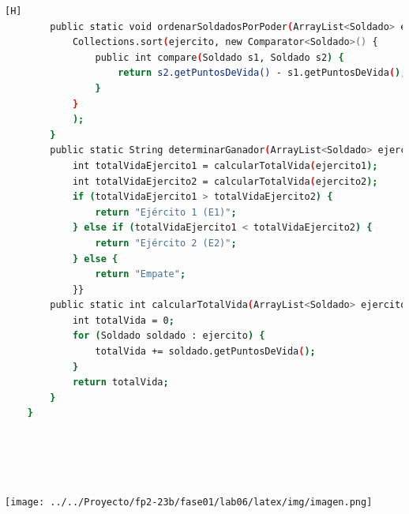 \documentclass{article}
\begin{document}
\begin{lstlisting}[language=bash,caption={Creando la clase principal de VideoJuego_v3.java}][H]
	    public static void ordenarSoldadosPorPoder(ArrayList<Soldado> ejercito) {
	        Collections.sort(ejercito, new Comparator<Soldado>() {     
	            public int compare(Soldado s1, Soldado s2) {
	                return s2.getPuntosDeVida() - s1.getPuntosDeVida();
	            }
	        }
	        );
	    }
	    public static String determinarGanador(ArrayList<Soldado> ejercito1, ArrayList<Soldado> ejercito2) {
	        int totalVidaEjercito1 = calcularTotalVida(ejercito1);
	        int totalVidaEjercito2 = calcularTotalVida(ejercito2);
	        if (totalVidaEjercito1 > totalVidaEjercito2) {
	            return "Ejército 1 (E1)";
	        } else if (totalVidaEjercito1 < totalVidaEjercito2) {
	            return "Ejército 2 (E2)";
	        } else {
	            return "Empate";
	        }}
	    public static int calcularTotalVida(ArrayList<Soldado> ejercito) {
	        int totalVida = 0;
	        for (Soldado soldado : ejercito) {
	            totalVida += soldado.getPuntosDeVida();
	        }
	        return totalVida;
	    }
	}
	
	
	
	
				\end{lstlisting}
\texttt{[image: ../../Proyecto/fp2-23b/fase01/lab06/latex/img/imagen.png]} 		
\end{document}
